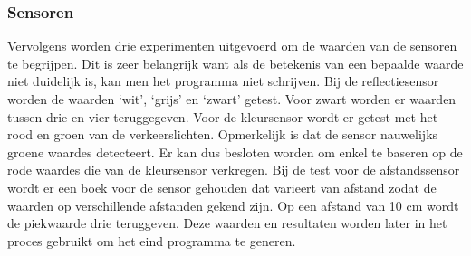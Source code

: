 \documentclass[a4paper,twoside,kulak]{kulakreport} %
\begin{document}
\subsubsection{Sensoren}

Vervolgens worden drie experimenten uitgevoerd om de waarden van de sensoren te begrijpen. Dit is zeer belangrijk want als de betekenis van een bepaalde waarde niet duidelijk is, kan men het programma niet schrijven.
Bij de reflectiesensor worden de waarden `wit', `grijs' en `zwart' getest. 
Voor zwart worden er waarden tussen drie en vier teruggegeven.  
Voor de kleursensor wordt er getest met het rood en groen van de verkeerslichten. 
Opmerkelijk is dat de sensor nauwelijks groene waardes detecteert. Er kan dus besloten worden om enkel te baseren op de rode waardes die van de kleursensor verkregen.
Bij de test voor de afstandssensor wordt er een boek voor de sensor gehouden dat varieert van afstand zodat de waarden op verschillende afstanden gekend zijn. Op een afstand van 10 cm wordt de piekwaarde drie teruggeven.
Deze waarden en resultaten worden later in het proces gebruikt om het eind programma te generen.



\end{document}
